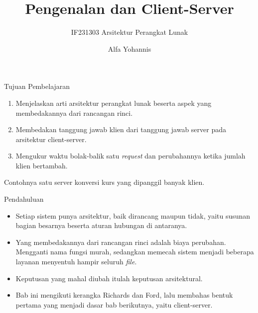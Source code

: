 \documentclass[aspectratio=169, table, 12pt]{beamer}
\title{\Huge{Pengenalan dan Client-Server}}
\subtitle{IF231303 Arsitektur Perangkat Lunak}
\author{Alfa Yohannis}
\begin{document}
\frame{\titlepage}

\begin{frame}{{\Large Tujuan Pembelajaran}}
  \vspace{10pt}
  \begin{enumerate}
    \item Menjelaskan arti arsitektur perangkat lunak beserta aspek yang
          membedakannya dari rancangan rinci.
    \item Membedakan tanggung jawab klien dari tanggung jawab server pada
          arsitektur client-server.
    \item Mengukur waktu bolak-balik satu \textit{request} dan perubahannya
          ketika jumlah klien bertambah.
  \end{enumerate}

  \vspace{10pt}
  {\small Contohnya satu server konversi kurs yang dipanggil banyak klien.}
\end{frame}

\begin{frame}{{\Large Pendahuluan}}
  \vspace{8pt}
  \begin{itemize}\small
    \item Setiap sistem punya arsitektur, baik dirancang maupun tidak, yaitu
          susunan bagian besarnya beserta aturan hubungan di antaranya.
    \item Yang membedakannya dari rancangan rinci adalah biaya perubahan.
          Mengganti nama fungsi murah, sedangkan memecah sistem menjadi
          beberapa layanan menyentuh hampir seluruh \textit{file}.
    \item Keputusan yang mahal diubah itulah keputusan arsitektural.
    \item Bab ini mengikuti kerangka Richards dan Ford, lalu membahas bentuk
          pertama yang menjadi dasar bab berikutnya, yaitu client-server.
  \end{itemize}
\end{frame}
\end{document}
